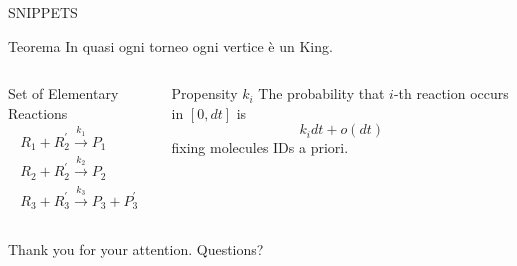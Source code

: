 \documentclass{beamer}
\begin{document}
\begin{frame}{SNIPPETS}
  \begin{center}
    \begin{minipage}{.7 \textwidth}
      \begin{block}{Teorema}
        In quasi ogni torneo ogni vertice è un King.
      \end{block}
    \end{minipage}
  \end{center}
  \begin{columns}
    \begin{column}{.45 \textwidth}
      \begin{block}{Set of Elementary Reactions}
        \begin{equation*}
          \begin{gathered}
            R_1 + R^\prime_2 \xrightarrow{k_1} P_1 \\
            R_2 + R^\prime_2 \xrightarrow{k_2} P_2 \\
            R_3 + R_3^\prime \xrightarrow{k_3} P_3 + P_3^\prime 
          \end{gathered}
        \end{equation*}
      \end{block}
    \end{column} 
    \begin{column}{.45 \textwidth}
      \begin{block}{Propensity $k_i$}
        The probability that $i$-th reaction occurs
        in  $[0, dt]$ is
        $$k_i dt + o(dt)$$
        fixing molecules IDs a priori.
      \end{block}
    \end{column}
  \end{columns}
\end{frame}

\begin{frame}
  \begin{center}
    \Huge{Thank you for your attention.}
    \Huge{Questions?}
  \end{center}
\end{frame}
\end{document}

